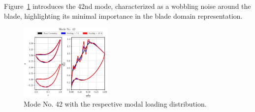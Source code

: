\documentclass[11pt,a4paper,twocolumn]{article}
\newcommand\widthPCA{0.4}
\begin{document}
Figure~\ref{fig:PCAmode42} introduces the 42nd mode, characterized as a wobbling noise around the blade, highlighting its minimal importance in the blade domain representation.

\begin{figure}[!h]
    \centering
    \includegraphics[width=\widthPCA\textwidth]{./images/mode42.eps}
    \caption{Mode No. 42 with the respective modal loading distribution.}
    \label{fig:PCAmode42}
\end{figure}




\end{document}
